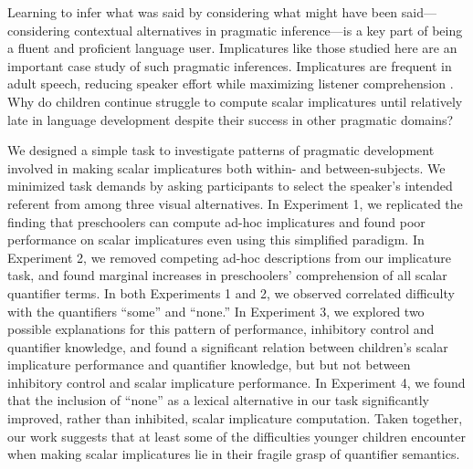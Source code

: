 \documentclass[man]{apa2}
\begin{document}

Learning to infer what was said by considering what might have been said---considering contextual alternatives in pragmatic inference---is a key part of being a fluent and proficient language user. Implicatures like those studied here are an important case study of such pragmatic inferences. Implicatures are frequent in adult speech, reducing speaker effort while maximizing listener comprehension \cite{grice1975,horn1984}. Why do children continue struggle to compute scalar implicatures until relatively late in language development despite their success in other pragmatic domains?

We designed a simple task to investigate patterns of pragmatic development involved in making scalar implicatures both within- and between-subjects. We minimized task demands by asking participants to select the speaker's intended referent from among three visual alternatives. In Experiment 1, we replicated the finding that preschoolers can compute ad-hoc implicatures \cite{stiller2015} and found poor performance on scalar implicatures even using this simplified paradigm. In Experiment 2, we removed competing ad-hoc descriptions from our implicature task, and found marginal increases in preschoolers' comprehension of all scalar quantifier terms. In both Experiments 1 and 2, we observed correlated difficulty with the quantifiers ``some'' and ``none.'' In Experiment 3, we explored two possible explanations for this pattern of performance, inhibitory control and quantifier knowledge, and found a significant relation between children's scalar implicature performance and quantifier knowledge, but but not between inhibitory control and scalar implicature performance. In Experiment 4, we found that the inclusion of ``none'' as a lexical alternative in our task significantly improved, rather than inhibited, scalar implicature computation. Taken together, our work suggests that at least some of the difficulties younger children encounter when making scalar implicatures lie in their fragile grasp of quantifier semantics.
\end{document}
